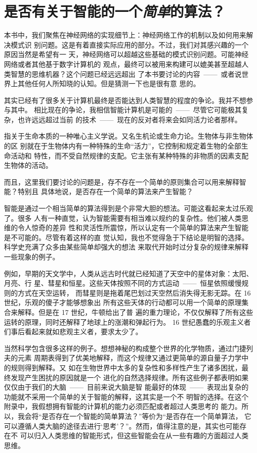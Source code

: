 
\chapter{是否有关于智能的一个\emph{简单}的算法？}

本书中，我们聚焦在神经网络的实现细节上：神经网络工作的机制以及如何用来解决模式识
别问题。这是有着直接实际应用的部分。不过，我们对其感兴趣的一个原因当然是希望有一
天，神经网络可以超越这些基础的模式识别问题。可能神经网络或者其他基于数字计算机的
观点，最终可以被用来构建可以媲美甚至超越人类智慧的思维机器？这个问题已经远远超出
了本书要讨论的内容~——~或者说世界上其他任何人所知晓的认知。但是猜测一下也是很有意
思的。

其实已经有了很多关于计算机最终是否能达到人类智慧的程度的争论。我并不想参与其中。
相比现在的争论，我相信智能计算机是可能的~——~尽管它可能极其复杂，也许远远超过当前
的技术~——~现在的反对者将来会如同活力论者那样。

    指关于生命本质的一种唯心主义学说。又名生机论或生命力论。生物体与非生物体的区
    别就在于生物体内有一种特殊的生命“活力”，它控制和规定着生物的全部生命活动和
    特性，而不受自然规律的支配。它主张有某种特殊的非物质的因素支配生物体的活动。

而且，这里我们要讨论的问题是，存不存在一个简单的原则集合可以用来解释智能？特别且
具体地说，是否存在一个简单的算法来产生智能？

智能是通过一个相当简单的算法得到是个非常大胆的想法。可能这看起来太过乐观了。很多
人有一种直觉，认为智能需要有相当难以规约的复杂性。他们被人类思维的令人惊奇的差异
性和灵活性所震惊，所以认定有一个简单的算法来产生智能是不可能的。尽管有着这样的直
觉认知，我也不觉得急于下结论是明智的选择。科学史充满了众多由某些简单却强大的想法
来取代开始时过分复杂的规律来解释一些现象的例子。

例如，早期的天文学中，人类从远古时代就已经知道了天空中的星体对象：太阳、月亮、行
星、彗星和恒星。这些天体按照不同的方式运动~——~恒星依照缓慢规则的方式在天空运转，
而彗星则是拖着尾巴划过天空然后消失得无影无踪。在 16 世纪，乐观的傻子才能够想象出
所有这些天体的行动都可以用一个简单的原理集合来解释。但是在 17 世纪，牛顿给出了普
遍的重力理论，不仅仅解释了所有这些运转的原理，同时还解释了地球上的涨潮和弹起行为。
16 世纪愚蠢的乐观主义者们事后看起来就如悲观主义者，要求太少了。

当然科学包含很多这样的例子。想想神秘的构成整个世界的化学物质，通过门捷列夫的元素
周期表得到了优美地解释，而这个规律又通过更简单的源自量子力学中的规则得到解释。又
如在生物世界中太多的复杂性和多样性产生了诸多困扰，最终发现产生困扰的原因就是一个
进化的自然选择规律。所有这些例子都表明如果仅仅由于我们的大脑~——~目前来说大脑是智
能最好的体现~——~表现出复杂的功能就不采用一个简单的关于智能的解释，这其实是一个不
明智的选择。在这个附录中，我假想拥有智能的计算机的能力必须匹配或者超过人类思考的
能力。所以，我会将“是否存在一个智能的简单算法？”等价为“是否存在一个简单算法，
它可以遵循人类大脑的途径去进行‘思考’？”。然而，值得注意的是，其实也可能存在不
可以归入人类思维的智能形式，但这些智能会在从一些有趣的方面超过人类思维。

